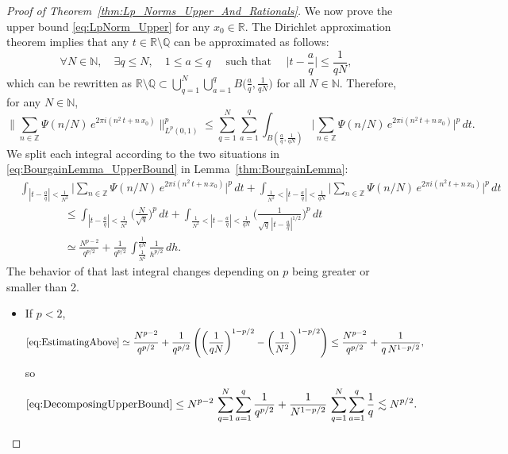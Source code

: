 \documentclass[11pt,reqno]{amsart}
\theoremstyle{definition}
\begin{document}
\begin{proof}[Proof of Theorem~\ref{thm:Lp_Norms_Upper_And_Rationals}]
	We now prove the upper bound \eqref{eq:LpNorm_Upper} for any $x_0 \in \mathbb R$. 
The Dirichlet approximation theorem implies that any $t \in \mathbb R \setminus \mathbb Q$ can be approximated as follows:
\begin{equation}
\forall N \in \mathbb N, \quad \exists q \leq N, \quad 1 \leq a \leq q \quad \text{ such that } \quad \Big| t - \frac{a}{q} \Big| \leq \frac{1}{qN},  
\end{equation}
which can be rewritten as $\mathbb R \setminus \mathbb Q \subset \bigcup_{q=1}^N \bigcup_{a=1}^q B \big( \frac{a}{q}, \frac{1}{qN} \big)$ for all $N \in \mathbb N$. 
Therefore, for any $N \in \mathbb N$, 
\begin{equation}\label{eq:DecomposingUpperBound}
 \Big\lVert  \sum_{n \in \mathbb Z} \Psi(n/N)\,  e^{2\pi i (n^2 \, t + n \, x_0)}  \Big\rVert_{L^p(0,1)}^p 
 \leq \sum_{q=1}^N \sum_{a=1}^q \int_{B(  \frac{a}{q}, \frac{1 }{qN} )}   \Big|  \sum_{n \in \mathbb Z}  \Psi(n/N)\,  e^{2\pi i (n^2 \, t + n \, x_0)}  \Big|^p\, dt.
\end{equation}
We split each integral according to the two situations in \eqref{eq:BourgainLemma_UpperBound} 
in Lemma~\ref{thm:BourgainLemma}:
\begin{equation}\label{eq:EstimatingAbove}
\begin{split}
& \int_{|t - \frac{a}{q}| < \frac{1}{N^2} }   \Big|  \sum_{n \in \mathbb Z}  \Psi(n/N) \,  e^{2\pi i (n^2 \, t + n \, x_0)}  \Big|^p\, dt  + \int_{ \frac{1}{N^2}  < |t - \frac{a}{q}| < \frac{1}{qN} }   \Big|  \sum_{n \in \mathbb Z}  \Psi(n/N) \,  e^{2\pi i (n^2 \, t + n \, x_0)}  \Big|^p\, dt \\
& \qquad \qquad \leq \int_{|t - \frac{a}{q}| < \frac{1}{N^2} }  \Big( \frac{N}{\sqrt{q} } \Big)^p\, dt  + \int_{\frac{1}{N^2} <|t - \frac{a}{q}| < \frac{1}{qN} }  \Big( \frac{1}{\sqrt{q} \,  |t - \frac{a}{q}|^{1/2 } }  \Big)^p\, dt \\
& \qquad \qquad \simeq  \frac{N^{p-2}}{q^{p/2}} + \frac{1}{q^{p/2}} \, \int_{\frac{1}{N^2}}^{\frac{1}{qN}}  \frac{1}{h^{p/2}} \, dh.
\end{split}
\end{equation} 
The behavior of that last integral changes depending on $p$ being greater or smaller than 2.  
\begin{itemize}
	\item If $p < 2$, 
	\begin{equation}
	\eqref{eq:EstimatingAbove} \simeq \frac{N^{p-2}}{q^{p/2}} + \frac{1}{q^{p/2}} \left( \left( \frac{1}{qN} \right)^{1-p/2} - \left( \frac{1}{N^2} \right)^{1-p/2} \right)
	\leq \frac{N^{p-2}}{q^{p/2}} +  \frac{1}{q\, N^{1-p/2}},
	\end{equation}
	so 
	\begin{equation}
	\eqref{eq:DecomposingUpperBound} 
	 \leq N^{p-2}\, \sum_{q=1}^N \sum_{a=1}^q \frac{1}{q^{p/2}} + \frac{1}{ N^{1-p/2}}\,  \sum_{q=1}^N \sum_{a=1}^q \frac{1}{q}
	\lesssim N^{p/2}. 
	\end{equation}
	

\end{itemize}
\end{proof}
\end{document}
